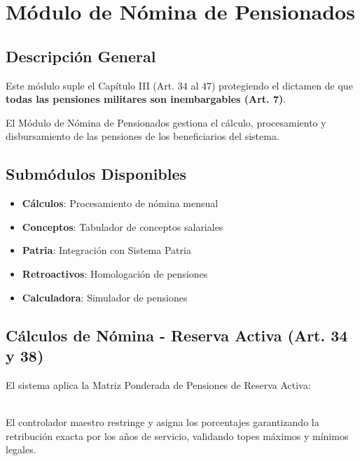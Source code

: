 
\chapter{Módulo de Nómina de Pensionados}
\label{ch:nomina-pensionados}

\section{Descripción General}

Este módulo suple el Capítulo III (Art. 34 al 47) protegiendo el dictamen de que \textbf{todas las pensiones militares son inembargables (Art. 7)}.

El Módulo de Nómina de Pensionados gestiona el cálculo, procesamiento y disbursamiento de las pensiones de los beneficiarios del sistema.

\section{Submódulos Disponibles}

\begin{itemize}[leftmargin=*]
    \item \textbf{Cálculos}: Procesamiento de nómina mensual
    \item \textbf{Conceptos}: Tabulador de conceptos salariales
    \item \textbf{Patria}: Integración con Sistema Patria
    \item \textbf{Retroactivos}: Homologación de pensiones
    \item \textbf{Calculadora}: Simulador de pensiones
\end{itemize}

\section{Cálculos de Nómina - Reserva Activa (Art. 34 y 38)}

El sistema aplica la Matriz Ponderada de Pensiones de Reserva Activa:

\\
El controlador maestro restringe y asigna los porcentajes garantizando la retribución exacta por los años de servicio, validando topes máximos y mínimos legales.

